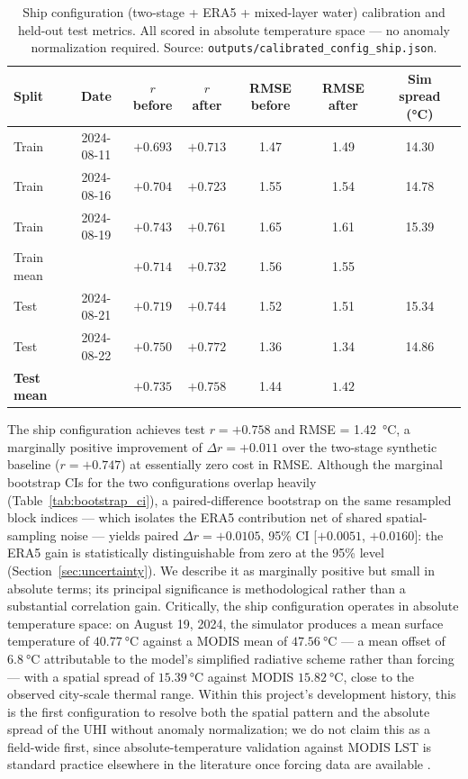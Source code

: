 \documentclass[12pt, letterpaper]{article}
\begin{document}
\begin{table}[ht]
  \centering
  \caption{Ship configuration (two-stage + ERA5 + mixed-layer water)
  calibration and held-out test metrics. All scored in absolute
  temperature space — no anomaly normalization required.
  Source: \texttt{outputs/calibrated\_config\_ship.json}.}
  \label{tab:ship_metrics}
  \begin{tabular}{lcccccc}
    \toprule
    Split & Date & $r$ before & $r$ after & RMSE before & RMSE after
           & Sim spread (°C) \\
    \midrule
    Train & 2024-08-11 & $+0.693$ & $+0.713$ & 1.47 & 1.49 & 14.30 \\
    Train & 2024-08-16 & $+0.704$ & $+0.723$ & 1.55 & 1.54 & 14.78 \\
    Train & 2024-08-19 & $+0.743$ & $+0.761$ & 1.65 & 1.61 & 15.39 \\
    \midrule
    Train mean & & $+0.714$ & $+0.732$ & 1.56 & 1.55 & \\
    \midrule
    Test & 2024-08-21 & $+0.719$ & $+0.744$ & 1.52 & 1.51 & 15.34 \\
    Test & 2024-08-22 & $+0.750$ & $+0.772$ & 1.36 & 1.34 & 14.86 \\
    \midrule
    \textbf{Test mean} & & $+0.735$ & $\mathbf{+0.758}$
                       & 1.44 & $\mathbf{1.42}$ & \\
    \bottomrule
  \end{tabular}
\end{table}

The ship configuration achieves test $r = +0.758$ and
RMSE = \SI{1.42}{\degreeCelsius}, a marginally positive improvement of
$\Delta r = +0.011$ over the two-stage synthetic baseline ($r = +0.747$) at
essentially zero cost in RMSE. Although the marginal bootstrap CIs for the
two configurations overlap heavily (Table~\ref{tab:bootstrap_ci}), a
paired-difference bootstrap on the same resampled block indices — which
isolates the ERA5 contribution net of shared spatial-sampling noise —
yields paired $\Delta r = +0.0105$, 95\% CI [$+0.0051$, $+0.0160$]:
the ERA5 gain is statistically distinguishable from zero at the 95\% level
(Section~\ref{sec:uncertainty}). We describe it as marginally positive but
small in absolute terms; its principal significance is methodological rather
than a substantial correlation gain. Critically, the
ship configuration operates in absolute temperature space: on August 19,
2024, the simulator produces a mean surface temperature of
$\SI{40.77}{\degreeCelsius}$ against a MODIS mean of
$\SI{47.56}{\degreeCelsius}$ — a mean offset of $\SI{6.8}{\degreeCelsius}$
attributable to the model's simplified radiative scheme rather than forcing
— with a spatial spread of $\SI{15.39}{\degreeCelsius}$ against MODIS
$\SI{15.82}{\degreeCelsius}$, close to the observed city-scale thermal
range. Within this project's development history, this is the first
configuration to resolve both the spatial pattern and the absolute spread
of the UHI without anomaly normalization; we do not claim this as a
field-wide first, since absolute-temperature validation against MODIS LST
is standard practice elsewhere in the literature once forcing data are
available \citep{mitraka2025prototypes}.
\end{document}
